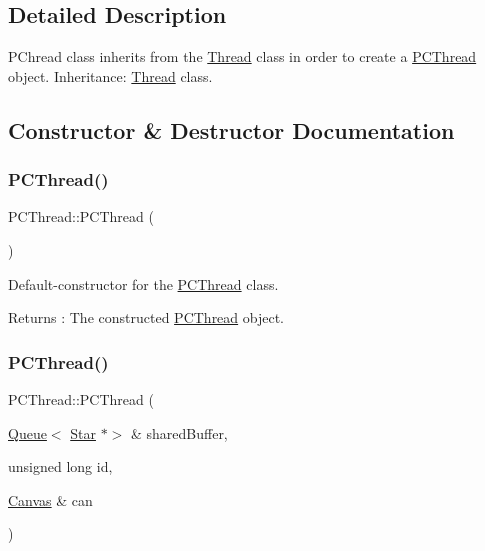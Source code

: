 \subsection{Detailed Description}
P\+Chread class inherits from the \hyperlink{class_thread}{Thread} class in order to create a \hyperlink{class_p_c_thread}{P\+C\+Thread} object. Inheritance\+: \hyperlink{class_thread}{Thread} class. 

\subsection{Constructor \& Destructor Documentation}
\mbox{\label{class_p_c_thread_a7ae0244c033e4202d2643544432f91f7}} 
\subsubsection{\texorpdfstring{P\+C\+Thread()}{PCThread()}\hspace{0.1cm}{\footnotesize\ttfamily [1/2]}}
{\footnotesize\ttfamily P\+C\+Thread\+::\+P\+C\+Thread (\begin{DoxyParamCaption}{ }\end{DoxyParamCaption})}



Default-\/constructor for the \hyperlink{class_p_c_thread}{P\+C\+Thread} class. 

\begin{DoxyReturn}{Returns}
\+: The constructed \hyperlink{class_p_c_thread}{P\+C\+Thread} object. 
\end{DoxyReturn}
\mbox{\label{class_p_c_thread_abe06615f59879c19d703a93889f5e7cc}} 
\subsubsection{\texorpdfstring{P\+C\+Thread()}{PCThread()}\hspace{0.1cm}{\footnotesize\ttfamily [2/2]}}
{\footnotesize\ttfamily P\+C\+Thread\+::\+P\+C\+Thread (\begin{DoxyParamCaption}\item[{\hyperlink{class_queue}{Queue}$<$ \hyperlink{classtsgl_1_1_star}{Star} $\ast$$>$ \&}]{shared\+Buffer,  }\item[{unsigned long}]{id,  }\item[{\hyperlink{classtsgl_1_1_canvas}{Canvas} \&}]{can }\end{DoxyParamCaption})}

